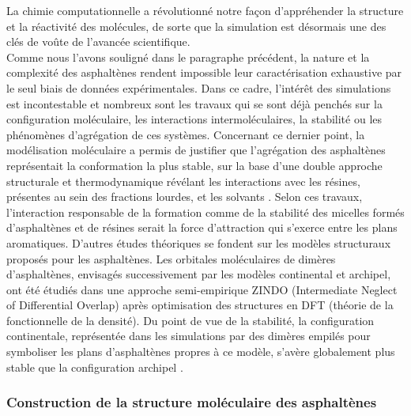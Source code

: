 La chimie computationnelle a révolutionné notre façon d'appréhender la structure et la réactivité des molécules, de sorte que la simulation est désormais une des clés de voûte de l'avancée scientifique. \\
Comme nous l'avons souligné dans le paragraphe précédent, la nature et la complexité des asphaltènes rendent impossible leur caractérisation exhaustive par le seul biais de données expérimentales. Dans ce cadre, l'intérêt des simulations est incontestable et nombreux sont les travaux qui se sont déjà penchés sur la configuration moléculaire, les interactions intermoléculaires, la stabilité ou les phénomènes d'agrégation de ces systèmes.  
Concernant ce dernier point, la modélisation moléculaire a permis de justifier que l'agrégation des asphaltènes représentait la conformation la plus stable, sur la base d'une double approche structurale et thermodynamique révélant les interactions avec les résines, présentes au sein des fractions lourdes, et les solvants \cite{murgich1996molecular}. Selon ces travaux, l'interaction responsable de la formation comme de la stabilité des micelles formés d'asphaltènes et de résines serait la force d'attraction qui s'exerce entre les plans aromatiques. 
D'autres études théoriques se fondent sur les modèles structuraux proposés pour les asphaltènes. Les orbitales moléculaires de dimères d'asphaltènes, envisagés successivement par les modèles continental et archipel, ont été étudiés dans une approche semi-empirique ZINDO (Intermediate Neglect of Differential Overlap) après optimisation des structures en DFT (théorie de la fonctionnelle de la densité). Du point de vue de la stabilité, la configuration continentale, représentée dans les simulations par des dimères empilés pour symboliser les plans d'asphaltènes propres à ce modèle, s'avère globalement plus stable que la configuration archipel \cite{alvarez2013island}. 


\subsubsection{Construction de la structure moléculaire des asphaltènes}

